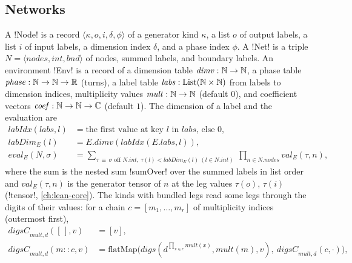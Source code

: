 {\subsection{Networks}

A \lbx!Node! is a record $\langle \kappa, o, i, \delta, \phi\rangle$ of a generator kind $\kappa$, a list $o$ of output labels, a list $i$ of input labels, a dimension index $\delta$, and a phase index $\phi$. A \lbx!Net! is a triple $N=\langle\mathit{nodes},\mathit{int},\mathit{bnd}\rangle$ of nodes, summed labels, and boundary labels. An environment \lbx!Env! is a record of a dimension table $\mathit{dimv}:\mathbb{N}\to\mathbb{N}$, a phase table $\mathit{phase}:\mathbb{N}\to\mathbb{N}\to\mathbb{R}$ (turns), a label table $\mathit{labs}:\mathrm{List}(\mathbb{N}\times\mathbb{N})$ from labels to dimension indices, multiplicity values $\mathit{mult}:\mathbb{N}\to\mathbb{N}$ (default $0$), and coefficient vectors $\mathit{coef}:\mathbb{N}\to\mathbb{N}\to\mathbb{C}$ (default $1$). The dimension of a label and the evaluation are
\begin{align*}
\mathit{labIdx}(\mathit{labs},l) &= \text{the first value at key } l \text{ in } \mathit{labs}\text{, else } 0,\\
\mathit{labDim}_E(l) &= E.\mathit{dimv}(\mathit{labIdx}(E.\mathit{labs},l)),\\
\mathit{eval}_E(N,\sigma) &= \sum_{\tau \,\equiv\, \sigma \text{ off } N.\mathit{int},\ \tau(l)<\mathit{labDim}_E(l)\ (l\in N.\mathit{int})}\ \prod_{n\in N.\mathit{nodes}} \mathit{val}_E(\tau,n),
\end{align*}
where the sum is the nested sum \lbx!sumOver! over the summed labels in list order and $\mathit{val}_E(\tau,n)$ is the generator tensor of $n$ at the leg values $\tau(o)$, $\tau(i)$ (\lbx!tensor!, \cref{ch:lean-core}). The kinds with bundled legs read some legs through the digits of their values: for a chain $c=[m_1,\dots,m_r]$ of multiplicity indices (outermost first),
\begin{equation}\label{eq:boxes-digsC}
\begin{aligned}
\mathit{digsC}_{\mathit{mult},d}([\,],v)&=[v],\\
\mathit{digsC}_{\mathit{mult},d}(m{::}c,v)&=\mathrm{flatMap}\bigl(\mathit{digs}(d^{\prod_{x\in c}\mathit{mult}(x)},\mathit{mult}(m),v),\ \mathit{digsC}_{\mathit{mult},d}(c,\cdot)\bigr),
\end{aligned}
\end{equation}
}
